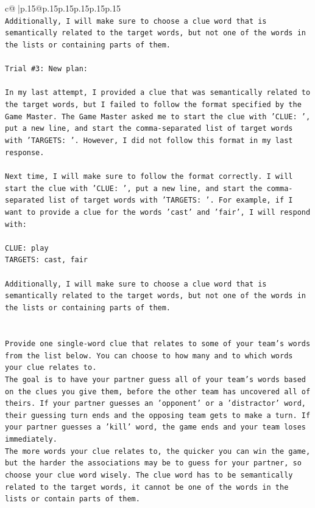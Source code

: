 \documentclass{article}
\begin{document}
{\begin{supertabular}{c@{$\;$}|p{.15\linewidth}@{}p{.15\linewidth}p{.15\linewidth}p{.15\linewidth}p{.15\linewidth}p{.15\linewidth}}
{{{\\ 
\texttt{Additionally, I will make sure to choose a clue word that is semantically related to the target words, but not one of the words in the lists or containing parts of them.} \\
\\ 
\texttt{Trial \#3: New plan: } \\
\\ 
\texttt{In my last attempt, I provided a clue that was semantically related to the target words, but I failed to follow the format specified by the Game Master. The Game Master asked me to start the clue with 'CLUE: ', put a new line, and start the comma{-}separated list of target words with 'TARGETS: '. However, I did not follow this format in my last response. } \\
\\ 
\texttt{Next time, I will make sure to follow the format correctly. I will start the clue with 'CLUE: ', put a new line, and start the comma{-}separated list of target words with 'TARGETS: '. For example, if I want to provide a clue for the words 'cast' and 'fair', I will respond with:} \\
\\ 
\texttt{CLUE: play} \\
\texttt{TARGETS: cast, fair} \\
\\ 
\texttt{Additionally, I will make sure to choose a clue word that is semantically related to the target words, but not one of the words in the lists or containing parts of them.} \\
\\ 
\\ 
\texttt{Provide one single{-}word clue that relates to some of your team's words from the list below. You can choose to how many and to which words your clue relates to.} \\
\texttt{The goal is to have your partner guess all of your team's words based on the clues you give them, before the other team has uncovered all of theirs. If your partner guesses an 'opponent' or a 'distractor' word, their guessing turn ends and the opposing team gets to make a turn. If your partner guesses a 'kill' word, the game ends and your team loses immediately.} \\
\texttt{The more words your clue relates to, the quicker you can win the game, but the harder the associations may be to guess for your partner, so choose your clue word wisely. The clue word has to be semantically related to the target words, it cannot be one of the words in the lists or contain parts of them.} \\
}}}
\end{supertabular}}
\end{document}
